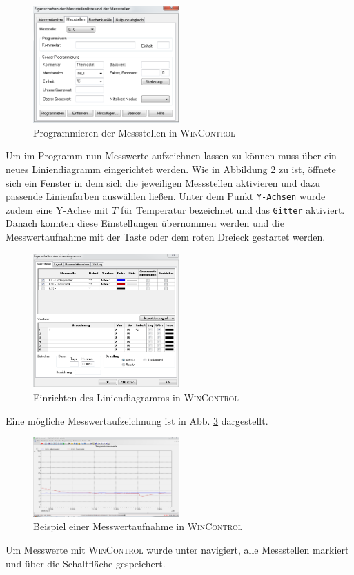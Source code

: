 \begin{figure}[h!]
	\centering
	\includegraphics[width=0.5\textwidth]{img/almemo_2}
	\caption{Programmieren der Messstellen in \textsc{WinControl}}
	\label{fig:almemo_programm}
\end{figure}
\FloatBarrier

Um im Programm nun Messwerte aufzeichnen lassen zu können muss über  ein neues Liniendiagramm eingerichtet werden. Wie in Abbildung \ref{fig:almemo_linien} zu ist, öffnete sich ein Fenster in dem sich die jeweiligen Messstellen aktivieren und dazu passende Linienfarben auswählen ließen. Unter dem Punkt \texttt{Y-Achsen} wurde zudem eine Y-Achse mit $T$ für Temperatur bezeichnet und das \texttt{Gitter} aktiviert. Danach konnten diese Einstellungen übernommen werden und die Messwertaufnahme mit der Taste  oder dem roten Dreieck gestartet werden.
\begin{figure}[h!]
	\centering
	\includegraphics[width=0.5\textwidth]{img/almemo_3}
	\caption{Einrichten des Liniendiagramms in \textsc{WinControl}}
	\label{fig:almemo_linien}
\end{figure}
\FloatBarrier
Eine mögliche Messwertaufzeichnung ist in Abb. \ref{fig:almemo_beispiel} dargestellt.
\begin{figure}[h!]
	\centering
	\includegraphics[width=0.5\textwidth]{img/almemo_4}
	\caption{Beispiel einer Messwertaufnahme in \textsc{WinControl}}
	\label{fig:almemo_beispiel}
\end{figure}
\FloatBarrier
Um Messwerte mit \textsc{WinControl} wurde unter  navigiert, alle Messstellen markiert und über die Schaltfläche  gespeichert.

